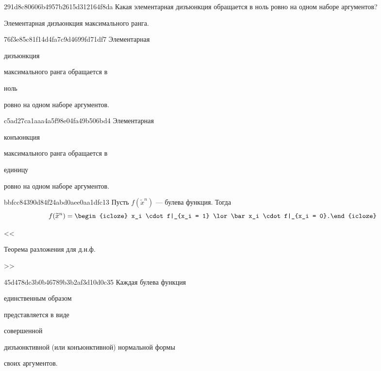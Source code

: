 \begin{note}{291d8c80606b4957b2615d312164f8da}
    Какая элементарная дизъюнкция обращается в ноль ровно на одном наборе аргументов?

    \begin{cloze}{1}
        Элементарная дизъюнкция максимального ранга.
    \end{cloze}
\end{note}

\begin{note}{76f3e85c81f14d4fa7c9d4699fd71df7}
    Элементарная \begin{icloze}{1}дизъюнкция\end{icloze} максимального ранга обращается в \begin{icloze}{2}ноль\end{icloze} ровно на одном наборе аргументов.
\end{note}

\begin{note}{c5ad27ca1aaa4a5f98e04fa49b506bd4}
    Элементарная \begin{icloze}{1}конъюнкция\end{icloze} максимального ранга обращается в \begin{icloze}{2}единицу\end{icloze} ровно на одном наборе аргументов.
\end{note}

\begin{note}{bbfcc84390d84f24abd0aee0aa1dfc13}
    Пусть \({ f(\widetilde x^{n}) }\) --- булева функция.
    Тогда
    \[
        f(\widetilde x^{n}) = \begin{icloze}{1}x_i \cdot f|_{x_i = 1} \lor \bar x_i \cdot f|_{x_i = 0}.\end{icloze}
    \]

    \begin{center}
        \tiny
        <<\begin{icloze}{2}Теорема разложения для д.н.ф.\end{icloze}>>
    \end{center}
\end{note}

\begin{note}{45d478dc3b0b46789b3b2af3d10d0c35}
    Каждая булева функция \begin{icloze}{3}единственным образом\end{icloze} представляется в виде \begin{icloze}{1}совершенной\end{icloze} дизъюнктивной (или конъюнктивной) нормальной формы \begin{icloze}{2}своих аргументов.\end{icloze}
\end{note}

